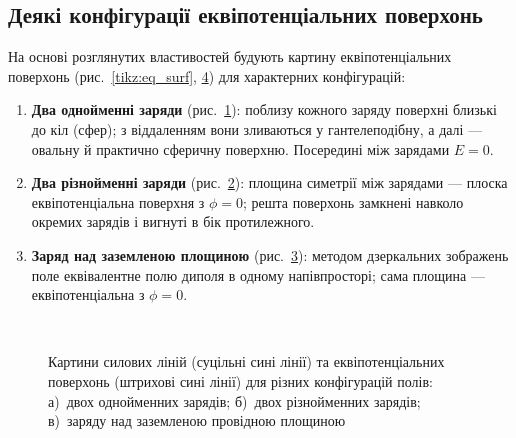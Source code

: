 \subsection{Деякі конфігурації еквіпотенціальних поверхонь}

На основі розглянутих властивостей будують картину еквіпотенціальних поверхонь (рис.~\ref{tikz:eq_surf}, \ref{fig:equipotentials_all}) для характерних конфігурацій:
\begin{enumerate}
    \item \textbf{Два однойменні заряди} (рис.~\ref{fig:like}): поблизу кожного заряду поверхні близькі до кіл (сфер); з віддаленням вони зливаються у гантелеподібну, а далі --- овальну й практично сферичну поверхню. Посередині між зарядами $E=0$.
    \item \textbf{Два різнойменні заряди} (рис.~\ref{fig:opposite}): площина симетрії між зарядами --- плоска еквіпотенціальна поверхня з $\phi=0$; решта поверхонь замкнені навколо окремих зарядів і вигнуті в бік протилежного.
    \item \textbf{Заряд над заземленою площиною} (рис.~\ref{fig:plane}): методом дзеркальних зображень поле еквівалентне полю диполя в одному напівпросторі; сама площина --- еквіпотенціальна з $\phi=0$.
\end{enumerate}

\begin{figure}[h!]
  \centering
  \begin{subfigure}[t]{0.45\linewidth}
    \centering
        
    \caption{}
    \label{fig:like}
  \end{subfigure}
  \hfill
  \begin{subfigure}[t]{0.45\linewidth}
    \centering
    
    \caption{}
    \label{fig:opposite}
  \end{subfigure}
  \\
  \begin{subfigure}[t]{1\linewidth}
    \centering
    
    \caption{}
    \label{fig:plane}
  \end{subfigure}

  \caption{Картини силових ліній (суцільні сині лінії) та еквіпотенціальних поверхонь (штрихові сині лінії) для різних конфігурацій полів: а)~двох однойменних зарядів; б)~двох різнойменних зарядів; в)~заряду над заземленою провідною площиною}
  \label{fig:equipotentials_all}
\end{figure}

